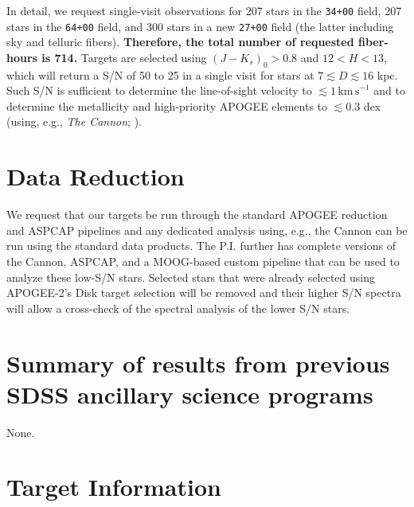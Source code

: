 \documentclass[12pt,preprint]{aastex}
\newcommand{\eg}{e.g.}
\begin{document}
In detail, we request single-visit observations for 207 stars in the
\texttt{34+00} field, 207 stars in the \texttt{64+00} field, and 300
stars in a new \texttt{27+00} field (the latter including sky and
telluric fibers). {\bf Therefore, the total number of requested
  fiber-hours is 714.} Targets are selected using $(J-K_s)_0 > 0.8$
and $12 < H < 13$, which will return a S/N of 50 to 25 in a single
visit for stars at $7 \lesssim D \lesssim 16$ kpc. Such S/N is
sufficient to determine the line-of-sight velocity to
$\lesssim1\,\mathrm{km\,s}^{-1}$ and to determine the metallicity and
high-priority APOGEE elements to $\lesssim0.3$ dex (using, \eg,
\emph{The Cannon}; \citealt{Ness15a}).

\section{Data Reduction}

We request that our targets be run through the standard APOGEE
reduction and ASPCAP pipelines and any dedicated analysis using, \eg,
the Cannon can be run using the standard data products. The
P.I. further has complete versions of the Cannon, ASPCAP, and a
MOOG-based custom pipeline that can be used to analyze these low-S/N
stars. Selected stars that were already selected using APOGEE-2's Disk
target selection will be removed and their higher S/N spectra will
allow a cross-check of the spectral analysis of the lower S/N stars.


\section{Summary of results from previous SDSS ancillary science programs}

None.

\newpage

\section{Target Information}
\end{document}
